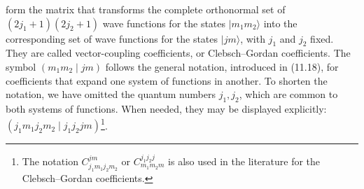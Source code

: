 form the matrix that transforms the complete orthonormal set of $(2j_1+1)(2j_2+1)$ wave functions for the states $|m_1m_2\rangle$ into the corresponding set of wave functions for the states $|jm\rangle$, with $j_1$ and $j_2$ fixed. They are called vector-coupling coefficients, or Clebsch--Gordan coefficients. The symbol $(m_1m_2\mid jm)$ follows the general notation, introduced in (11.18), for coefficients that expand one system of functions in another. To shorten the notation, we have omitted the quantum numbers $j_1,j_2$, which are common to both systems of functions. When needed, they may be displayed explicitly: $(j_1m_1j_2m_2\mid j_1j_2jm)$\footnote{The notation $C^{jm}_{j_1m_1j_2m_2}$ or $C^{j_1j_2j}_{m_1m_2m}$ is also used in the literature for the Clebsch--Gordan coefficients.}.
